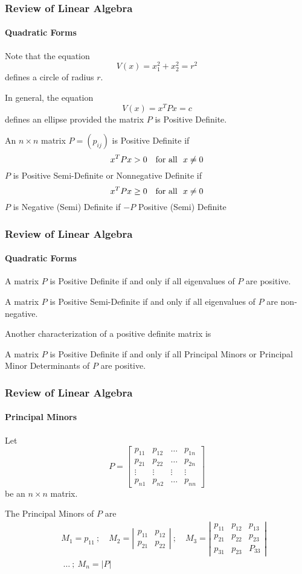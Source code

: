 \begin{frame}
\frametitle{Review of Linear Algebra}
\framesubtitle{Quadratic Forms}
Note that the equation
$$
V(x) = x_1^2 + x_2^2 = r^2
$$
defines a {\bor circle of radius $r$}.

In general, the equation
$$
V(x) = x^T P x = c
$$
defines an {\bor ellipse} provided the matrix $P$ is {\bor Positive Definite}.
\begin{definition}
An $n\times n$ matrix $P = (p_{ij})$ is {\bor Positive Definite} if
$$
x^T Px > 0 \quad \mbox{\rm for all } \ x \ne 0
$$
$P$ is {\bor Positive Semi-Definite} or {\bor Nonnegative Definite} if
$$
x^T Px \ge 0 \quad \mbox{\rm for all } \ x \ne 0
$$
$P$ is {\bor Negative (Semi) Definite} if $-P$ {\bor Positive (Semi) Definite}
\end{definition}
\end{frame}
\begin{frame}
\frametitle{Review of Linear Algebra}
\framesubtitle{Quadratic Forms}
\begin{theorem}
A matrix $P$ is {\bor Positive Definite} if and only if all eigenvalues of $P$ are positive.

A matrix $P$ is {\bor Positive Semi-Definite} if and only if all eigenvalues of $P$ are non-negative.
\end{theorem}
Another characterization of a positive definite matrix is
\begin{theorem}
A matrix $P$ is {\bor Positive Definite} if and only if all {\bor Principal Minors} or
{\bor Principal Minor Determinants} of $P$ are positive.
\end{theorem}
\end{frame}
\begin{frame}
\frametitle{Review of Linear Algebra}
\framesubtitle{Principal Minors}
\begin{definition}
Let
$$
P = \left[\begin{array}{cccc}
p_{11} & p_{12} & \dots & p_{1n} \\
p_{21} & p_{22} & \dots & p_{2n} \\
\vdots & \vdots & \vdots & \vdots \\
p_{n1} & p_{n2} & \dots & p_{nn}
\end{array}\right]
$$
be an $n\times n$ matrix.

The {\bor Principal Minors of $P$} are
\begin{eqnarray*}
&& M_1 = p_{11} \ ; \quad M_2 = \left|\begin{array}{cc} p_{11} & p_{12} \\ p_{21} & p_{22} \end{array}\right| \ ; \quad
M_3 = \left|\begin{array}{ccc} p_{11} & p_{12} & p_{13} \\ p_{21} & p_{22} & p_{23} \\
p_{31} & p_{23} & P_{33} \end{array}\right| \\
&& \ \dots \ ; \ M_n = |P|
\end{eqnarray*}
\end{definition}
\end{frame}
